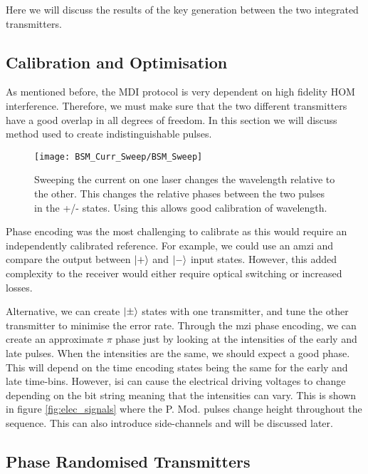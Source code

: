 Here we will discuss the results of the key generation between the two integrated transmitters.

\subsection{Calibration and Optimisation}

As mentioned before, the \ac{MDI} protocol is very dependent on high fidelity \ac{HOM} interference. Therefore, we must make sure that the two different transmitters have a good overlap in all degrees of freedom. In this section we will discuss method used to create indistinguishable pulses.

\begin{figure}[tbp]
	\centering
	\texttt{[image: BSM\_Curr\_Sweep/BSM\_Sweep]}
	\caption[Laser current-error sweep]{Sweeping the current on one laser changes the wavelength relative to the other. This changes the relative phases between the two pulses in the +/- states. Using this allows good calibration of wavelength.}
	\label{fig:wavelength_cal}
\end{figure}

Phase encoding was the most challenging to calibrate as this would require an independently calibrated reference. For example, we could use an \ac{amzi} and compare the output between $\ket{+}$ and $\ket{-}$ input states. However, this added complexity to the receiver would either require optical switching or increased losses. 

Alternative, we can create $\ket{\pm}$ states with one transmitter, and tune the other transmitter to minimise the error rate. Through the \ac{mzi} phase encoding, we can create an approximate $\pi$ phase just by looking at the intensities of the early and late pulses. When the intensities are the same, we should expect a good phase. This will depend on the time encoding states being the same for the early and late time-bins. However, \ac{isi} can cause the electrical driving voltages to change depending on the bit string meaning that the intensities can vary. This is shown in figure \ref{fig:elec_signals} where the P. Mod. pulses change height throughout the sequence. This can also introduce side-channels and will be discussed later.

\subsection{Phase Randomised Transmitters}

